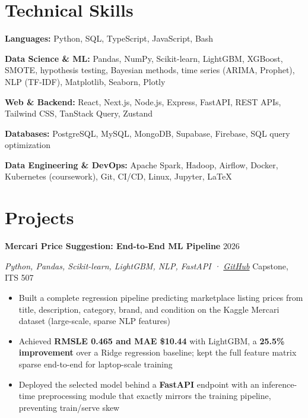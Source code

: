 \documentclass[11pt]{article}
\newcommand{\entry}[2]{\textbf{#1} \hfill {\small #2}\par}
\newcommand{\subentry}[2]{\textit{#1} \hfill {\small #2}\par}
\newcommand{\skillrow}[2]{\textbf{#1:} #2\par\vspace{2.5pt}}
\begin{document}
\section{Technical Skills}
\skillrow{Languages}{Python, SQL, TypeScript, JavaScript, Bash}
\skillrow{Data Science \& ML}{Pandas, NumPy, Scikit-learn, LightGBM, XGBoost, SMOTE, hypothesis testing, Bayesian methods, time series (ARIMA, Prophet), NLP (TF-IDF), Matplotlib, Seaborn, Plotly}
\skillrow{Web \& Backend}{React, Next.js, Node.js, Express, FastAPI, REST APIs, Tailwind CSS, TanStack Query, Zustand}
\skillrow{Databases}{PostgreSQL, MySQL, MongoDB, Supabase, Firebase, SQL query optimization}
\skillrow{Data Engineering \& DevOps}{Apache Spark, Hadoop, Airflow, Docker, Kubernetes (coursework), Git, CI/CD, Linux, Jupyter, LaTeX}

\section{Projects}

\entry{Mercari Price Suggestion: End-to-End ML Pipeline}{2026}
\subentry{Python, Pandas, Scikit-learn, LightGBM, NLP, FastAPI \;·\; \href{https://github.com/isttiiak/mercari-price-suggestion}{GitHub}}{Capstone, ITS 507}
\begin{itemize}
  \item Built a complete regression pipeline predicting marketplace listing prices from title, description, category, brand, and condition on the Kaggle Mercari dataset (large-scale, sparse NLP features)
  \item Achieved \textbf{RMSLE 0.465 and MAE \$10.44} with LightGBM, a \textbf{25.5\% improvement} over a Ridge regression baseline; kept the full feature matrix sparse end-to-end for laptop-scale training
  \item Deployed the selected model behind a \textbf{FastAPI} endpoint with an inference-time preprocessing module that exactly mirrors the training pipeline, preventing train/serve skew
\end{itemize}
\vspace{5pt}
\end{document}
